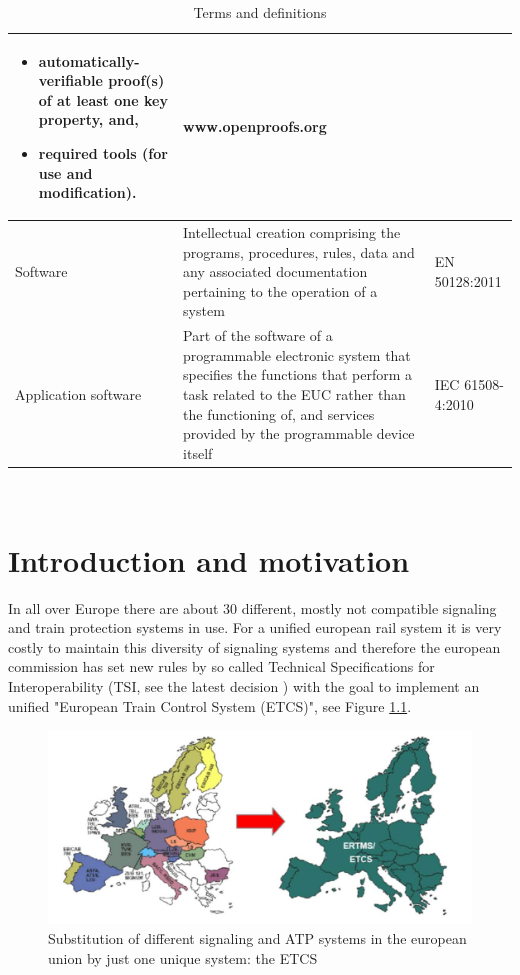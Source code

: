 \documentclass{template/openetcs_report}
\begin{document}
\begin{table} [h]
\begin{tabular}{|p{2cm}|p{9cm}|p{3cm}|}
\begin{itemize}
\item automatically-verifiable proof(s) of at least one key property, and,
\item required tools (for use and modification).
\end{itemize} & www.openproofs.org \\ 
\hline
Software & Intellectual creation comprising the programs, procedures, rules, data and any associated documentation pertaining to the operation of a system & EN 50128:2011 \\ 
\hline
Application software & Part of the software of a programmable electronic system that specifies the functions that perform a task related to the EUC rather than the functioning of, and services provided by the programmable device itself & IEC 61508-4:2010 \\ 
\hline
\end{tabular}
\\
\caption{Terms and definitions}
\end{table}


\chapter{Introduction and motivation}
In all over Europe there are about 30 different, mostly not compatible signaling and train protection systems in use. For a unified european rail system it is very costly to maintain this diversity of signaling systems and therefore the european commission has set new rules by so called Technical Specifications for Interoperability (TSI, see the latest decision \cite{TSI-doc}) with the goal to implement an unified "European Train Control System (ETCS)", see Figure \ref{fig:openETCS2}.

\begin{figure} [h]
\centering
\includegraphics[width=12cm]{openETCS2}
\caption{Substitution of different signaling and ATP systems in the european union by just one unique system: the ETCS}
\label{fig:openETCS2}
\end{figure}
\end{document}
